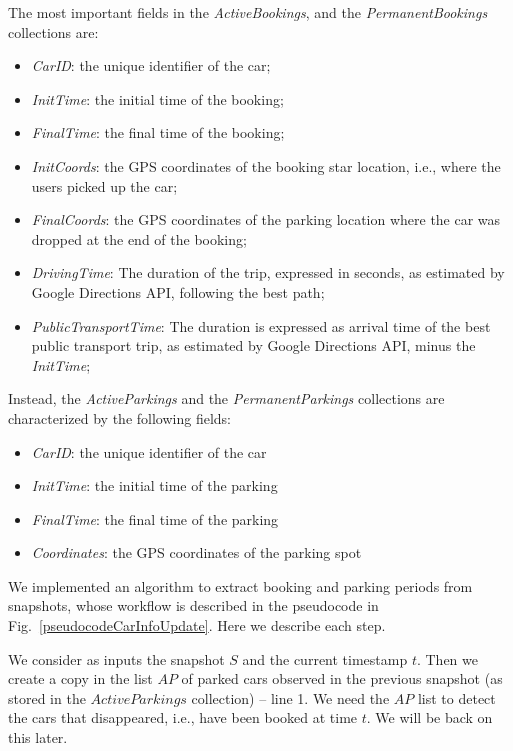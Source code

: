 The most important fields in the \textit{ActiveBookings}, and the \textit{PermanentBookings} collections are:
\begin{itemize}
\setlength\itemsep{0.1em}
\item \textit{CarID}: the unique identifier of the car;
\item \textit{InitTime}: the initial time of the booking;
\item \textit{FinalTime}:  the final time of the booking;
\item \textit{InitCoords}:  the GPS coordinates of the booking star location, i.e., where the users picked up the car;
\item \textit{FinalCoords}:  the GPS coordinates of the parking location where the car was dropped at the end of the booking;
\item \textit{DrivingTime}: The duration of the trip, expressed in seconds, as estimated by Google Directions API, following the best path;
\item \textit{PublicTransportTime}: The duration is expressed as arrival time of the best public transport trip, as estimated by Google Directions API, minus the \textit{InitTime};
\end{itemize}

Instead, the \textit{ActiveParkings} and the \textit{PermanentParkings} collections are characterized by the following fields:
\begin{itemize}
\setlength\itemsep{0.1em}
\item \textit{CarID}: the unique identifier of the car
\item \textit{InitTime}: the initial time of the parking
\item \textit{FinalTime}:  the final time of the parking
\item \textit{Coordinates}: the GPS coordinates of the parking spot 
\end{itemize}




We implemented an algorithm to extract booking and parking periods from snapshots, whose workflow is described in the pseudocode in Fig.~\ref{pseudocodeCarInfoUpdate}. Here we describe each  step.

We consider as inputs the snapshot $S$ and the current timestamp $t$.
Then we create a copy in the list $AP$ of parked cars observed in the previous snapshot (as stored in the $ActiveParkings$ collection) -- line 1. We need the $AP$ list to detect the cars that disappeared, i.e., have been booked at time $t$. We will be back on this later.

